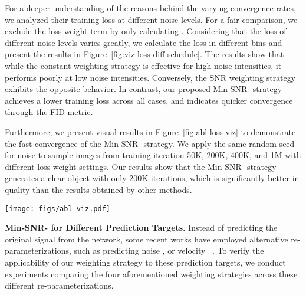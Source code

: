 For a deeper understanding of the reasons behind the varying convergence rates, we analyzed their training loss at different noise levels. For a fair comparison, we exclude the loss weight term by only calculating . 
Considering that the loss of different noise levels varies greatly, we calculate the loss in different bins and present the results in Figure~\ref{fig:viz-loss-diff-schedule}. 
The results show that while the constant weighting strategy is effective for high noise intensities, it performs poorly at low noise intensities. Conversely, the SNR weighting strategy exhibits the opposite behavior. 
In contrast, our proposed Min-SNR- strategy achieves a lower training loss across all cases, and indicates quicker convergence through the FID metric.







Furthermore, we present visual results in Figure~\ref{fig:abl-loss-viz} to demonstrate the fast convergence of the Min-SNR- strategy. 
We apply the same random seed for noise to sample images from training iteration 50K, 200K, 400K, and 1M with different loss weight settings. Our results show that the Min-SNR- strategy generates a clear object with only 200K iterations, which is significantly better in quality than the results obtained by other methods.




\begin{figure*}[!h]
    \centering
    \texttt{[image: figs/abl-viz.pdf]}
    \caption{Qualitative comparison of the generation results from different weighting strategies on ImageNet-256 dataset. Images in each column are sampled from 50K, 200K, 400K, and 1M iterations. Our Min-SNR-5 strategy yields significant improvements in visual fidelity from the same iteration.}
    \label{fig:abl-loss-viz}
    \vspace{-5mm}
\end{figure*}



\noindent \textbf{Min-SNR- for Different Prediction Targets.}
Instead of predicting the original signal  from the network, some recent works have employed alternative re-parameterizations, such as predicting noise , or velocity ~\cite{salimans2022distillprogressive}. To verify the applicability of our weighting strategy to these prediction targets, we conduct experiments comparing the four aforementioned weighting strategies across these different re-parameterizations. 

